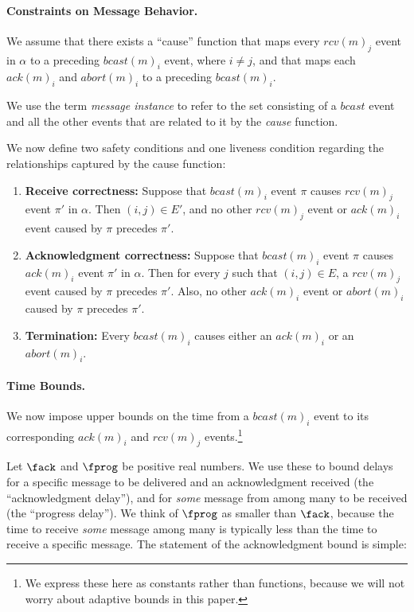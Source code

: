\paragraph{Constraints on Message Behavior.}
We assume that there exists a ``cause'' function that maps every $rcv(m)_j$
event in $\alpha$ to a preceding $bcast(m)_i$ event, where $i \ne j$,
and that maps each $ack(m)_i$ and $abort(m)_i$ to a preceding $bcast(m)_i$.

We use the term \emph{message instance} to refer to the set
consisting of a $bcast$ event and all the other events that are
related to it by the \emph{cause} function.


We now define two safety conditions and one liveness condition
regarding the relationships captured by the cause function:

\begin{enumerate}
\item {\bf Receive correctness:}
Suppose that $bcast(m)_i$ event $\pi$ causes $rcv(m)_j$ event $\pi'$
in $\alpha$.
Then $(i,j) \in E'$, and no other $rcv(m)_j$ event or $ack(m)_i$ event
caused by $\pi$ precedes $\pi'$.

\item  {\bf Acknowledgment correctness:}
Suppose that $bcast(m)_i$ event $\pi$ causes $ack(m)_i$ event $\pi'$ in $\alpha$.
Then for every $j$ such that $(i,j) \in E$, a $rcv(m)_j$ event caused
by $\pi$ precedes $\pi'$.
Also, no other $ack(m)_i$ event or $abort(m)_i$ caused by $\pi$
precedes $\pi'$.

\item  {\bf Termination:}
Every $bcast(m)_i$ causes either an $ack(m)_i$ or an $abort(m)_i$.
\end{enumerate}

\paragraph{Time Bounds.}
We now impose upper bounds on the time from a $bcast(m)_i$ event to
its corresponding $ack(m)_i$ and $rcv(m)_j$ events.\footnote{
  We express these here as constants rather than functions, because we
  will not worry about adaptive bounds in this paper.
  }

Let $\fack$ and $\fprog$ be positive real numbers.
We use these to bound delays for a specific message to be delivered
and an acknowledgment received (the ``acknowledgment delay''), and for
{\em some} message from among many to be received (the ``progress
delay'').
We think of $\fprog$ as smaller than $\fack$, because the time to
receive {\em some} message among many is typically less than the time
to receive a specific message.
The statement of the acknowledgment bound is simple:

